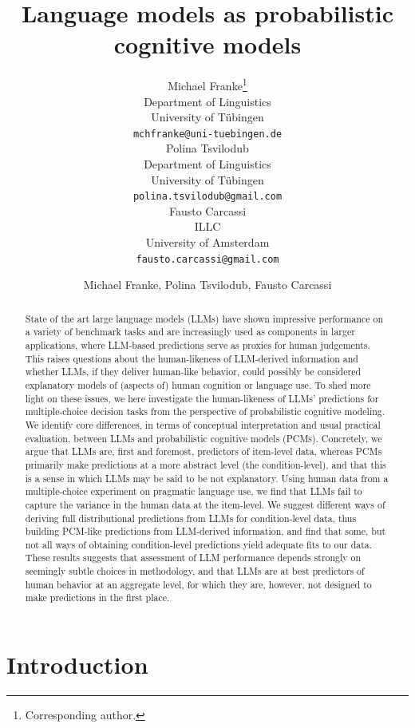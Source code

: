 \documentclass[fleqn]{article}
\title{Language models as probabilistic cognitive models}
\date{}
\author{ Michael Franke\thanks{Corresponding author.} \\
	Department of Linguistics\\
	University of Tübingen\\
	\texttt{mchfranke@uni-tuebingen.de} \\
	\And
	Polina Tsvilodub \\
	Department of Linguistics\\
	University of Tübingen\\
	\texttt{polina.tsvilodub@gmail.com} \\
	\And
	Fausto Carcassi \\
	ILLC\\
	University of Amsterdam\\
	\texttt{fausto.carcassi@gmail.com} \\
}
\author{Michael Franke, Polina Tsvilodub, Fausto Carcassi}
\affil{Department of Linguistics\\University of Tübingen\\
\texttt{[michael.franke|polina.tsvilodub|fausto.carcassi]@uni-tuebingen.de}}
\begin{document}
\maketitle

\begin{abstract}
  State of the art large language models (LLMs) have shown impressive performance on a variety of benchmark tasks and are increasingly used as components in larger applications, where LLM-based predictions serve as proxies for human judgements.
  This raises questions about the human-likeness of LLM-derived information and whether LLMs, if they deliver human-like behavior, could possibly be considered explanatory models of (aspects of) human cognition or language use.
  To shed more light on these issues, we here investigate the human-likeness of LLMs' predictions for multiple-choice decision tasks from the perspective of probabilistic cognitive modeling.
  We identify core differences, in terms of conceptual interpretation and usual practical evaluation, between LLMs and probabilistic cognitive models (PCMs).
  Concretely, we argue that LLMs are, first and foremost, predictors of item-level data, whereas PCMs primarily make predictions at a more abstract level (the condition-level), and that this is a sense in which LLMs may be said to be not explanatory.
  Using human data from a multiple-choice experiment on pragmatic language use, we find that LLMs fail to capture the variance in the human data at the item-level.
  We suggest different ways of deriving full distributional predictions from LLMs for condition-level data, thus building PCM-like predictions from LLM-derived information, and find that some, but not all ways of obtaining condition-level predictions yield adequate fits to our data.
  These results suggests that assessment of LLM performance depends strongly on seemingly subtle choices in methodology, and that LLMs are at best predictors of human behavior at an aggregate level, for which they are, however, not designed to make predictions in the first place.
\end{abstract}



\section{Introduction}
\label{sec:introduction}
\end{document}
